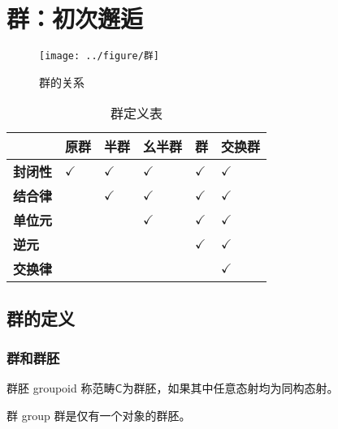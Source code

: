 % 

% 

\chapter{群：初次邂逅}

\begin{figure}[H]
	\centering
	\texttt{[image: ../figure/群]}
	\caption{群的关系}
\end{figure}

\begin{table}[H]
	\centering
	\caption{群定义表}
	\begin{tabular}{|>{\centering\arraybackslash}m{1.5cm}|>{\centering\arraybackslash}m{1.5cm}|>{\centering\arraybackslash}m{1.5cm}|>{\centering\arraybackslash}m{1.5cm}|>{\centering\arraybackslash}m{1.5cm}|>{\centering\arraybackslash}m{1.5cm}|}
		\hline
		& \textbf{原群} & \textbf{半群} & \textbf{幺半群} & \textbf{群} & \textbf{交换群} \\
		\hline
		\textbf{封闭性} & $\checkmark$ & $\checkmark$ & $\checkmark$ & $\checkmark$ & $\checkmark$ \\
		\hline
		\textbf{结合律} & & $\checkmark$ & $\checkmark$ & $\checkmark$ & $\checkmark$ \\
		\hline
		\textbf{单位元} & & & $\checkmark$ & $\checkmark$ & $\checkmark$ \\
		\hline
		\textbf{逆元} & & & & $\checkmark$ & $\checkmark$ \\
		\hline
		\textbf{交换律} & & & & & $\checkmark$ \\
		\hline
	\end{tabular}
\end{table}

\section{群的定义}

\subsection{群和群胚}

\begin{definition}{群胚 groupoid}
	称范畴$\mathsf{C}$为群胚，如果其中任意态射均为同构态射。
\end{definition}

\begin{definition}{群 group}
	群是仅有一个对象的群胚。
\end{definition}

